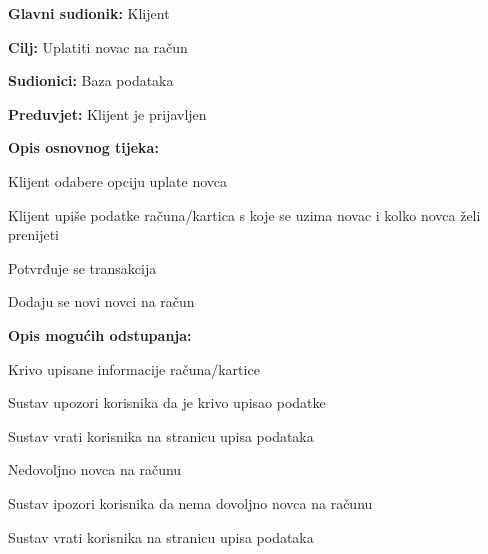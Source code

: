 						\noindent {}
					\begin{packed_item}
	
						\item \textbf{Glavni sudionik: }Klijent
						\item  \textbf{Cilj:} Uplatiti novac na račun
						\item  \textbf{Sudionici:} Baza podataka
						\item  \textbf{Preduvjet:} Klijent je prijavljen
						\item  \textbf{Opis osnovnog tijeka:}
						
						\item[] \begin{packed_enum}
	
							\item Klijent odabere opciju uplate novca
							\item Klijent upiše podatke računa/kartica s koje se uzima novac i kolko novca želi prenijeti
							\item Potvrđuje se transakcija
							\item Dodaju se novi novci na račun
							
							
						\end{packed_enum}

						\item  \textbf{Opis mogućih odstupanja:}
						
						\item[] \begin{packed_item}
	
							\item[2.a] Krivo upisane informacije računa/kartice
							\item[] \begin{packed_enum}
								
								\item Sustav upozori korisnika da je krivo upisao podatke
								\item Sustav vrati korisnika na stranicu upisa podataka
								
								
							\end{packed_enum}

							\item[3.a] Nedovoljno novca na računu
							\item[] \begin {packed_enum}

								\item Sustav ipozori korisnika da nema dovoljno novca na računu
								\item Sustav vrati korisnika na stranicu upisa podataka

						\end{packed_enum}
	
							
						\end{packed_item}	

					\end{packed_item}

